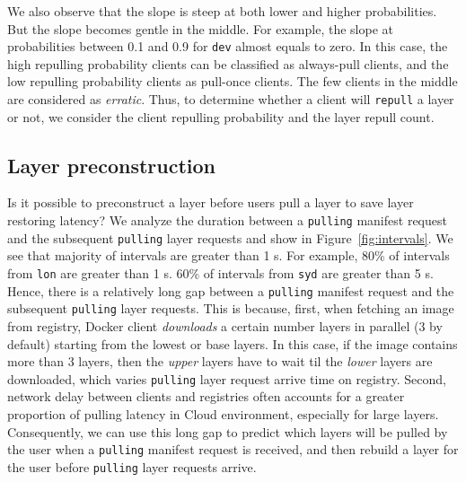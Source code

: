 We also observe that the slope is steep at both lower and higher probabilities.
But the slope becomes gentle in the middle.  For example, the slope at
probabilities between 0.1 and 0.9 for \texttt{dev} almost equals to zero.  In
this case, the high repulling probability clients can be classified as
always-pull clients, and the low repulling probability clients as pull-once
clients.  The few clients in the middle are considered as \emph{erratic}.
%
Thus, to determine whether a client will \texttt{repull} a layer or not, we
consider the client repulling probability and the layer repull count.



\subsection{Layer preconstruction}

%
Is it possible to preconstruct a layer before users pull a layer to save layer
restoring latency?  We analyze the duration between a \texttt{pulling} manifest
request and the subsequent \texttt{pulling} layer requests and show in
Figure~\ref{fig:intervals}.  We see that majority of intervals are greater than
1 s.  For example, 80\% of intervals from \texttt{lon} are greater than 1 s.
60\% of intervals from \texttt{syd} are greater than 5 s.  Hence, there is a
relatively long gap between a \texttt{pulling} manifest request and the
subsequent \texttt{pulling} layer requests.  This is because, first, when
fetching an image from registry, Docker client \emph{downloads} a certain
number layers in parallel (3 by default) starting from the lowest or base
layers.  In this case, if the image contains more than 3 layers, then the
\emph{upper} layers have to wait til the \emph{lower} layers are downloaded,
which varies \texttt{pulling} layer request arrive time on registry.  Second,
network delay between clients and registries often accounts for a greater
proportion of pulling latency in Cloud environment, especially for large
layers.  Consequently, we can use this long gap to predict which layers will be
pulled by the user when a \texttt{pulling} manifest request is received, and
then rebuild a layer for the user before \texttt{pulling} layer requests
arrive.


